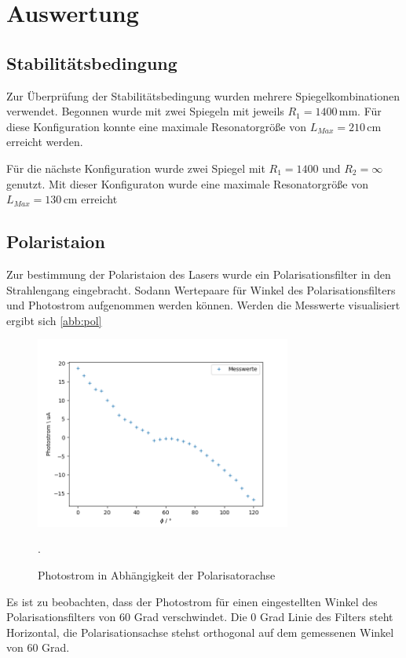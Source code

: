 \section{Auswertung}
\subsection{Stabilitätsbedingung}
Zur Überprüfung der Stabilitätsbedingung wurden mehrere Spiegelkombinationen verwendet.
Begonnen wurde mit zwei Spiegeln mit jeweils $R_1 = 1400 \, \text{mm}$.
Für diese Konfiguration konnte eine maximale Resonatorgröße von $L_{Max} = 210 \, \text{cm}$ erreicht werden.

Für die nächste Konfiguration wurde zwei Spiegel mit $R_1 = 1400$ und $R_2 = \infty$ genutzt.
Mit dieser Konfiguraton wurde eine maximale Resonatorgröße von $L_{Max} = 130 \, \text{cm}$ erreicht

\subsection{Polaristaion}
Zur bestimmung der Polaristaion des Lasers wurde ein Polarisationsfilter in den Strahlengang eingebracht. Sodann Wertepaare für
Winkel des Polarisationsfilters und Photostrom aufgenommen werden können. Werden die Messwerte visualisiert ergibt sich \autoref{abb:pol}

\begin{figure}[h]
  \centering
  \includegraphics[width=0.75\textwidth]{img/pol.png}
  \caption{Photostrom in Abhängigkeit der Polarisatorachse}.
  \label{abb:pol}
\end{figure}

Es ist zu beobachten, dass der Photostrom für einen eingestellten Winkel des Polarisationsfilters von 60 Grad verschwindet.
Die 0 Grad Linie des Filters steht Horizontal, die Polarisationsachse stehst orthogonal auf dem gemessenen Winkel von 60 Grad.


